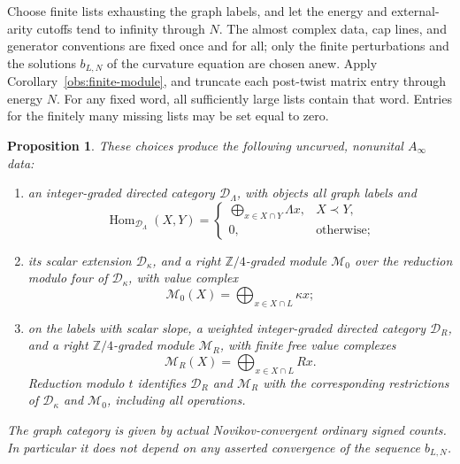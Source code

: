 \documentclass[11pt]{article}
\newtheorem{proposition}[theorem]{Proposition}
\theoremstyle{definition}
\theoremstyle{remark}
\newcommand{\Z}{\mathbb Z}
\newcommand{\Ainf}{A_\infty}
\DeclareMathOperator{\Hom}{Hom}
\numberwithin{equation}{section}
\begin{document}
Choose finite lists exhausting the graph labels, and let the energy and
external-arity cutoffs tend to infinity through \(N\).
The almost complex data, cap lines, and generator conventions are fixed
once and for all; only the finite perturbations and the solutions
\(b_{L,N}\) of the curvature equation are chosen anew.
Apply Corollary~\ref{obs:finite-module}, and truncate each post-twist
matrix entry through energy \(N\).  For any fixed word, all sufficiently
large lists contain that word.  Entries for the finitely many missing
lists may be set equal to zero.

\begin{proposition}\label{cat:module}
These choices produce the following uncurved, nonunital
\(\Ainf\) data:
\begin{enumerate}[label=\textup{(\roman*)}]
 \item an integer-graded directed category \(\mathcal D_\Lambda\), with
 objects all graph labels and
 \[
 \Hom_{\mathcal D_\Lambda}(X,Y)=
 \begin{cases}
   \displaystyle\bigoplus_{x\in X\cap Y}\Lambda x,&X\prec Y,\\
   0,&\text{otherwise};
 \end{cases}
 \]
 \item its scalar extension \(\mathcal D_\kappa\), and a right
 \(\Z/4\)-graded module \(\mathcal M_0\) over the reduction modulo four
 of \(\mathcal D_\kappa\), with value complex
 \[
 \mathcal M_0(X)=\bigoplus_{x\in X\cap L}\kappa x;
 \]
 \item on the labels with scalar slope, a weighted integer-graded
 directed category \(\mathcal D_R\), and a right \(\Z/4\)-graded module
 \(\mathcal M_R\), with finite free value complexes
 \[
 \mathcal M_R(X)=\bigoplus_{x\in X\cap L}R x.
 \]
 Reduction modulo \(t\) identifies \(\mathcal D_R\) and \(\mathcal M_R\)
 with the corresponding restrictions of \(\mathcal D_\kappa\) and
 \(\mathcal M_0\), including all operations.
\end{enumerate}
The graph category is given by actual Novikov-convergent ordinary signed
counts.  In particular it does not depend on any asserted convergence
of the sequence \(b_{L,N}\).
\end{proposition}
\end{document}

